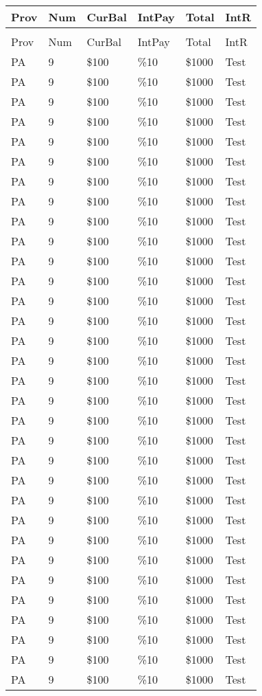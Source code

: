 \documentclass{article}%
\begin{document}
%
\normalsize%
\begin{longtabu}{X[r] X[r] X[r] X[r] X[r] X[r]}%
\textbf{Prov}&\textbf{Num}&\textbf{CurBal}&\textbf{IntPay}&\textbf{Total}&\textbf{IntR}\\%
\hline%
&&&&&\\%
\endhead%
Prov&Num&CurBal&IntPay&Total&IntR\\%
PA&9&\$100&\%10&\$1000&Test\\%
PA&9&\$100&\%10&\$1000&Test\\%
PA&9&\$100&\%10&\$1000&Test\\%
PA&9&\$100&\%10&\$1000&Test\\%
PA&9&\$100&\%10&\$1000&Test\\%
PA&9&\$100&\%10&\$1000&Test\\%
PA&9&\$100&\%10&\$1000&Test\\%
PA&9&\$100&\%10&\$1000&Test\\%
PA&9&\$100&\%10&\$1000&Test\\%
PA&9&\$100&\%10&\$1000&Test\\%
PA&9&\$100&\%10&\$1000&Test\\%
PA&9&\$100&\%10&\$1000&Test\\%
PA&9&\$100&\%10&\$1000&Test\\%
PA&9&\$100&\%10&\$1000&Test\\%
PA&9&\$100&\%10&\$1000&Test\\%
PA&9&\$100&\%10&\$1000&Test\\%
PA&9&\$100&\%10&\$1000&Test\\%
PA&9&\$100&\%10&\$1000&Test\\%
PA&9&\$100&\%10&\$1000&Test\\%
PA&9&\$100&\%10&\$1000&Test\\%
PA&9&\$100&\%10&\$1000&Test\\%
PA&9&\$100&\%10&\$1000&Test\\%
PA&9&\$100&\%10&\$1000&Test\\%
PA&9&\$100&\%10&\$1000&Test\\%
PA&9&\$100&\%10&\$1000&Test\\%
PA&9&\$100&\%10&\$1000&Test\\%
PA&9&\$100&\%10&\$1000&Test\\%
PA&9&\$100&\%10&\$1000&Test\\%
PA&9&\$100&\%10&\$1000&Test\\%
PA&9&\$100&\%10&\$1000&Test\\%
PA&9&\$100&\%10&\$1000&Test\\%
PA&9&\$100&\%10&\$1000&Test\\%

\end{longtabu}
\end{document}
